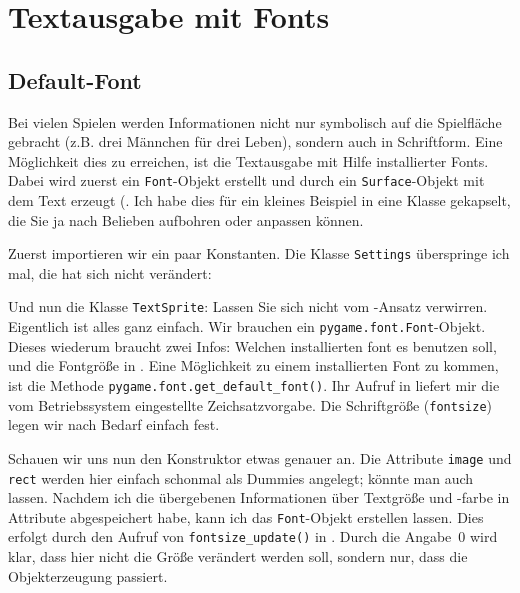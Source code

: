 \newpage
\section{Textausgabe mit Fonts}
\subsection{Default-Font}

Bei vielen Spielen werden Informationen nicht nur symbolisch auf die Spielfläche gebracht (z.B. drei Männchen für drei Leben), sondern auch in Schriftform. Eine Möglichkeit dies zu erreichen, ist die Textausgabe mit Hilfe installierter Fonts. Dabei wird zuerst ein \texttt{Font}-Objekt erstellt und durch ein \texttt{Surface}-Objekt mit dem Text erzeugt (. Ich habe dies für ein kleines Beispiel in eine Klasse gekapselt, die Sie ja nach Belieben aufbohren oder anpassen können.

Zuerst importieren wir ein paar Konstanten. Die Klasse \texttt{Settings} überspringe ich mal, die hat sich nicht verändert:


Und nun die Klasse \texttt{TextSprite}: Lassen Sie sich nicht vom -Ansatz verwirren. Eigentlich ist alles ganz einfach. Wir brauchen ein \texttt{pygame.font.\-Font}-Objekt. Dieses wiederum braucht zwei Infos: Welchen installierten \Gls{font} es benutzen soll, und die Fontgröße in . Eine Möglichkeit zu einem installierten Font zu kommen, ist die Methode \texttt{pygame.font.get\_default\_font()}. Ihr Aufruf in  liefert mir die vom Betriebssystem eingestellte Zeichsatzvorgabe. Die Schriftgröße (\texttt{fontsize}) legen wir nach Bedarf einfach fest. 


Schauen wir uns nun den Konstruktor etwas genauer an. Die  Attribute \texttt{image} und \texttt{rect} werden hier einfach schonmal als Dummies angelegt; könnte man auch lassen. Nachdem ich die übergebenen Informationen über Textgröße und -farbe in Attribute abgespeichert habe, kann ich das \texttt{Font}-Objekt erstellen lassen. Dies erfolgt durch den Aufruf von \texttt{fontsize\_update()} in . Durch die Angabe~0 wird klar, dass hier nicht die Größe verändert werden soll, sondern nur, dass die Objekterzeugung passiert. 

